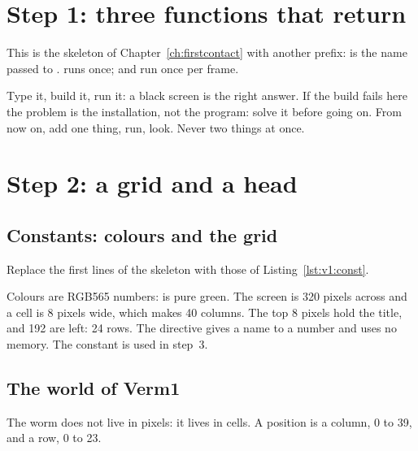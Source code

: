 \section{Step 1: three functions that return}


This is the skeleton of Chapter~\ref{ch:firstcontact} with another prefix:
 is the name passed to .  runs
once;  and  run once per frame.

\begin{prgcheck}[Run it]
Type it, build it, run it: a black screen is the right answer. If the build
fails here the problem is the installation, not the program: solve it before
going on. From now on, add one thing, run, look. Never two things at once.
\end{prgcheck}

\section{Step 2: a grid and a head}

\subsection{Constants: colours and the grid}

Replace the first lines of the skeleton with those of
Listing~\ref{lst:v1:const}.


Colours are RGB565 numbers:  is pure green. The screen is 320
pixels across and a cell is 8 pixels wide, which makes 40 columns. The top 8
pixels hold the title, and 192 are left: 24 rows. The directive 
gives a name to a number and uses no memory. The constant  is
used in step~3.

\subsection{The world of Verm1}

\begin{prgconcept}
The worm does not live in pixels: it lives in cells. A position is a column,
0 to 39, and a row, 0 to 23.
\end{prgconcept}

